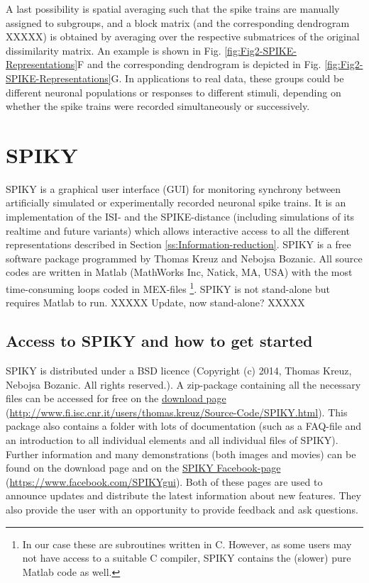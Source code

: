\documentclass[10pt,twocolumn]{elsart5p}
\begin{document}
 
A last possibility is spatial averaging such that the spike trains are manually assigned to subgroups, and a block matrix (and the corresponding dendrogram XXXXX) is obtained by averaging over the respective submatrices of the original dissimilarity matrix. An example is shown in Fig. \ref{fig:Fig2-SPIKE-Representations}F and the corresponding dendrogram is depicted in Fig. \ref{fig:Fig2-SPIKE-Representations}G. In applications to real data, these groups could be different neuronal populations or responses to different stimuli, depending on whether the spike trains were recorded simultaneously or successively.

%
%
%
%
\section{\label{s:SPIKY} SPIKY}

SPIKY is a graphical user interface (GUI) for monitoring synchrony between artificially simulated or experimentally recorded neuronal spike trains. It is an implementation of the ISI- and the SPIKE-distance (including simulations of its realtime and future variants) which allows  interactive access to all the different representations described in Section \ref{ss:Information-reduction}. SPIKY is a free software package programmed by Thomas Kreuz and Nebojsa Bozanic. All source codes are written in Matlab (MathWorks Inc, Natick, MA, USA) with the most time-consuming loops coded in MEX-files \footnote{In our case these are subroutines written in C. However, as some users may not have access to a suitable C compiler, SPIKY contains the (slower) pure Matlab code as well.}. SPIKY is not stand-alone but requires Matlab to run. XXXXX Update, now stand-alone? XXXXX


\subsection{\label{ss:Access} Access to SPIKY and how to get started}

SPIKY is distributed under a BSD licence (Copyright (c) 2014, Thomas Kreuz, Nebojsa Bozanic. All rights reserved.). A zip-package containing all the necessary files can be accessed for free on the \href{http://www.fi.isc.cnr.it/users/thomas.kreuz/Source-Code/SPIKY.html}{download page} (\url{http://www.fi.isc.cnr.it/users/thomas.kreuz/Source-Code/SPIKY.html}). This package also contains a folder with lots of documentation (such as a FAQ-file and an introduction to all individual elements and all individual files of SPIKY). Further information and many demonstrations (both images and movies) can be found on the download page and on the \href{https://www.facebook.com/SPIKYgui}{SPIKY Facebook-page} (\url{https://www.facebook.com/SPIKYgui}). Both of these pages are used to announce updates and distribute the latest information about new features. They also provide the user with an opportunity to provide feedback and ask questions.
\end{document}
